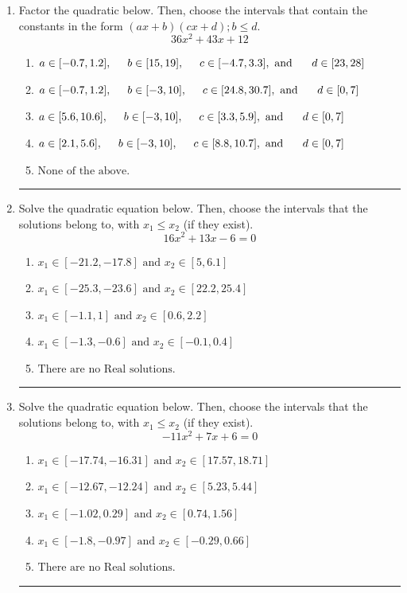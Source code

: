 \documentclass[14pt]{extbook}
\newcommand{\litem}[1]{\item#1\hspace*{-1cm}\rule{\textwidth}{0.4pt}}
\begin{document}
\begin{enumerate}
{\begin{enumerate}[label=\Alph*.]
\end{enumerate} }
\litem{
Factor the quadratic below. Then, choose the intervals that contain the constants in the form $(ax+b)(cx+d); b \leq d.$\[ 36x^{2} +43 x + 12 \]\begin{enumerate}[label=\Alph*.]
\item \( a \in [-0.7, 1.2], \hspace*{5mm} b \in [15, 19], \hspace*{5mm} c \in [-4.7, 3.3], \text{ and } \hspace*{5mm} d \in [23, 28] \)
\item \( a \in [-0.7, 1.2], \hspace*{5mm} b \in [-3, 10], \hspace*{5mm} c \in [24.8, 30.7], \text{ and } \hspace*{5mm} d \in [0, 7] \)
\item \( a \in [5.6, 10.6], \hspace*{5mm} b \in [-3, 10], \hspace*{5mm} c \in [3.3, 5.9], \text{ and } \hspace*{5mm} d \in [0, 7] \)
\item \( a \in [2.1, 5.6], \hspace*{5mm} b \in [-3, 10], \hspace*{5mm} c \in [8.8, 10.7], \text{ and } \hspace*{5mm} d \in [0, 7] \)
\item \( \text{None of the above.} \)

\end{enumerate} }
\litem{
Solve the quadratic equation below. Then, choose the intervals that the solutions belong to, with $x_1 \leq x_2$ (if they exist).\[ 16x^{2} +13 x -6 = 0 \]\begin{enumerate}[label=\Alph*.]
\item \( x_1 \in [-21.2, -17.8] \text{ and } x_2 \in [5, 6.1] \)
\item \( x_1 \in [-25.3, -23.6] \text{ and } x_2 \in [22.2, 25.4] \)
\item \( x_1 \in [-1.1, 1] \text{ and } x_2 \in [0.6, 2.2] \)
\item \( x_1 \in [-1.3, -0.6] \text{ and } x_2 \in [-0.1, 0.4] \)
\item \( \text{There are no Real solutions.} \)

\end{enumerate} }
\litem{
Solve the quadratic equation below. Then, choose the intervals that the solutions belong to, with $x_1 \leq x_2$ (if they exist).\[ -11x^{2} +7 x + 6 = 0 \]\begin{enumerate}[label=\Alph*.]
\item \( x_1 \in [-17.74, -16.31] \text{ and } x_2 \in [17.57, 18.71] \)
\item \( x_1 \in [-12.67, -12.24] \text{ and } x_2 \in [5.23, 5.44] \)
\item \( x_1 \in [-1.02, 0.29] \text{ and } x_2 \in [0.74, 1.56] \)
\item \( x_1 \in [-1.8, -0.97] \text{ and } x_2 \in [-0.29, 0.66] \)
\item \( \text{There are no Real solutions.} \)


\end{enumerate}}
\end{enumerate}
\end{document}
